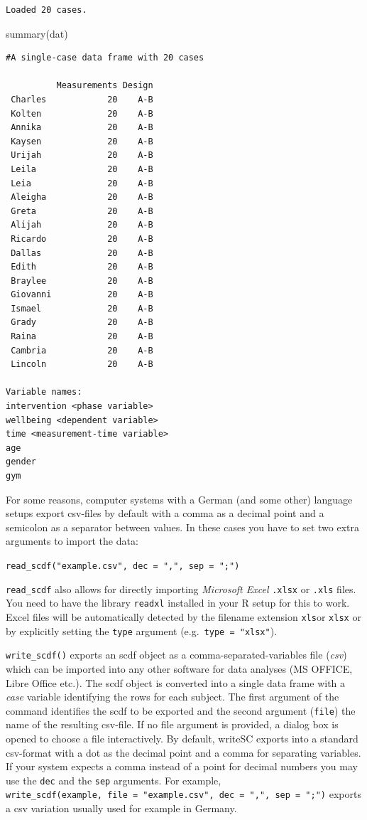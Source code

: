 \documentclass[
]{book}
\newenvironment{Shaded}{\begin{snugshade}}{\end{snugshade}}
\newcommand{\FunctionTok}[1]{\textcolor[rgb]{0.00,0.00,0.00}{#1}}
\newcommand{\NormalTok}[1]{#1}
\begin{document}
\begin{verbatim}
Loaded 20 cases.
\end{verbatim}

\begin{Shaded}
\begin{Highlighting}[]
\FunctionTok{summary}\NormalTok{(dat)}
\end{Highlighting}
\end{Shaded}

\begin{verbatim}
#A single-case data frame with 20 cases

          Measurements Design
 Charles            20    A-B
 Kolten             20    A-B
 Annika             20    A-B
 Kaysen             20    A-B
 Urijah             20    A-B
 Leila              20    A-B
 Leia               20    A-B
 Aleigha            20    A-B
 Greta              20    A-B
 Alijah             20    A-B
 Ricardo            20    A-B
 Dallas             20    A-B
 Edith              20    A-B
 Braylee            20    A-B
 Giovanni           20    A-B
 Ismael             20    A-B
 Grady              20    A-B
 Raina              20    A-B
 Cambria            20    A-B
 Lincoln            20    A-B

Variable names:
intervention <phase variable>
wellbeing <dependent variable>
time <measurement-time variable>
age
gender
gym
\end{verbatim}

For some reasons, computer systems with a German (and some other) language setups export csv-files by default with a comma as a decimal point and a semicolon as a separator between values. In these cases you have to set two extra arguments to import the data:

\texttt{read\_scdf("example.csv",\ dec\ =\ ",",\ sep\ =\ ";")}

\texttt{read\_scdf} also allows for directly importing \emph{Microsoft Excel} \texttt{.xlsx} or \texttt{.xls} files. You need to have the library \texttt{readxl} installed in your R setup for this to work. Excel files will be automatically detected by the filename extension \texttt{xls}or \texttt{xlsx} or by explicitly setting the \texttt{type} argument (e.g.~\texttt{type\ =\ "xlsx"}).

\texttt{write\_scdf()} exports an scdf object as a comma-separated-variables file (\emph{csv}) which can be imported into any other software for data analyses (MS OFFICE, Libre Office etc.). The scdf object is converted into a single data frame with a \emph{case} variable identifying the rows for each subject. The first argument of the command identifies the scdf to be exported and the second argument (\texttt{file}) the name of the resulting csv-file. If no file argument is provided, a dialog box is opened to choose a file interactively. By default, writeSC exports into a standard csv-format with a dot as the decimal point and a comma for separating variables. If your system expects a comma instead of a point for decimal numbers you may use the \texttt{dec} and the \texttt{sep} arguments. For example, \texttt{write\_scdf(example,\ file\ =\ "example.csv",\ dec\ =\ ",",\ sep\ =\ ";")} exports a csv variation usually used for example in Germany.
\end{document}
